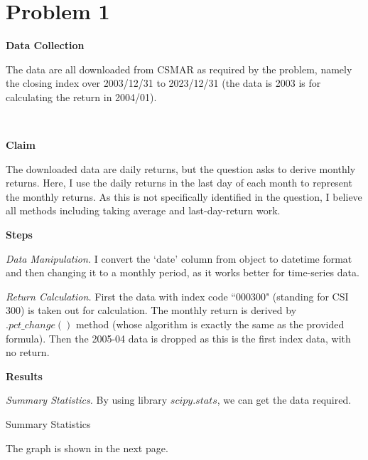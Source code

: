 
\section*{Problem 1}

\noindent
\textbf{Data Collection}

The data are all downloaded from CSMAR as required by the problem, namely the closing index over 2003/12/31 to 2023/12/31 (the data is 2003 is for calculating the return in 2004/01). 

\\

\noindent
\begin{Question} 


\noindent
\textbf{Claim} 

The downloaded data are daily returns, but the question asks to derive monthly returns. Here, I use the daily returns in the last day of each month to represent the monthly returns. As this is not specifically identified in the question, I believe all methods including taking average and last-day-return work.


\noindent
\textbf{Steps} 

\textit{Data Manipulation.} I convert the `date' column from object to datetime format and then changing it to a monthly period, as it works better for time-series data.


\textit{Return Calculation.} First the data with index code ``000300" (standing for CSI 300) is taken out for calculation. The monthly return is derived by $.pct\_change()$ method (whose algorithm is exactly the same as the provided formula). Then the 2005-04 data is dropped as this is the first index data, with no return.


\noindent
\textbf{Results} 

\textit{Summary Statistics.} By using library $scipy.stats$, we can get the data required.

\begin{table}[htbp]
    \centering
    \caption{Summary Statistics}
    \vspace{0.4cm}
\end{table}

\end{Question}



\noindent
\begin{Question} 

The graph is shown in the next page.
\end{Question}



